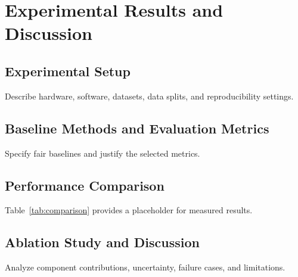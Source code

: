 \section{Experimental Results and Discussion}\label{sec:experiments}
\subsection{Experimental Setup}
Describe hardware, software, datasets, data splits, and reproducibility settings.
\subsection{Baseline Methods and Evaluation Metrics}
Specify fair baselines and justify the selected metrics.
\subsection{Performance Comparison}
Table~\ref{tab:comparison} provides a placeholder for measured results.

\subsection{Ablation Study and Discussion}
Analyze component contributions, uncertainty, failure cases, and limitations.
